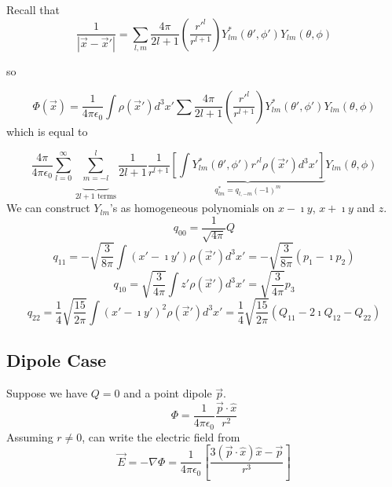 \documentclass[a4paper,twoside,master.tex]{subfiles}
\begin{document}
Recall that
\begin{equation}
    \frac{1}{|\vec{x}-\vec{x}'|} = \sum_{l,m} \frac{4\pi}{2l+1}\left( \frac{r'^{l}}{r^{l+1}} \right) Y_{lm}^*(\theta',\phi')Y_{lm}(\theta,\phi)
\end{equation}

so

\begin{equation}
    \Phi(\vec{x}) = \frac{1}{4\pi\epsilon_0}\int\rho(\vec{x}')d^3x'\sum \frac{4\pi}{2l+1}\left( \frac{r'^l}{r^{l+1}} \right) Y_{lm}^*(\theta',\phi')Y_{lm}(\theta,\phi)
\end{equation}
which is equal to

\begin{equation}
    \frac{4\pi}{4\pi\epsilon_0}\sum_{l=0}^{\infty}\underbrace{\sum_{m=-l}^{l}}_{2l+1\text{ terms}} \frac{1}{2l+1} \frac{1}{r^{l+1}}\underbrace{\left[ \int Y_{lm}^*(\theta',\phi')r'^l\rho(\vec{x}')d^3x' \right]}_{q_{lm}^*=q_{l,-m}(-1)^m} Y_{lm}(\theta,\phi)
\end{equation}
We can construct $Y_{lm}$'s as homogeneous polynomials on $x-\imath y$, $x+\imath y$ and $z$.
\begin{equation}
    q_{00} = \frac{1}{\sqrt{4\pi} }Q
\end{equation}
\begin{equation}
    q_{11} = -\sqrt{\frac{3}{8\pi}}\int(x'-\imath y')\rho(\vec{x}')d^3x' = -\sqrt{\frac{3}{8\pi}}(p_1-\imath p_2)
\end{equation}
\begin{equation}
    q_{10} = \sqrt{\frac{3}{4\pi}}\int z' \rho(\vec{x}')d^3x' = \sqrt{\frac{3}{4\pi}}p_3
\end{equation}
\begin{equation}
    q_{22} = \frac{1}{4}\sqrt{\frac{15}{2\pi}}\int(x'-\imath y')^2\rho(\vec{x}')d^3x' = \frac{1}{4}\sqrt{\frac{15}{2\pi}}(Q_{11}-2\imath Q_{12}-Q_{22})
\end{equation}

\subsection{Dipole Case}%
\label{sub:dipole_case}

Suppose we have $Q=0$ and a point dipole $\vec{p}$.
\begin{equation}
    \Phi = \frac{1}{4\pi\epsilon_0}\frac{\vec{p}\cdot \hat{x}}{r^2}
\end{equation}
Assuming $r\neq 0$, can write the electric field from
\begin{equation}
    \vec{E} = -\nabla \Phi = \frac{1}{4\pi\epsilon_0}\left[ \frac{3(\vec{p}\cdot \hat{x})\hat{x} - \vec{p}}{r^3} \right]
\end{equation}
\end{document}
